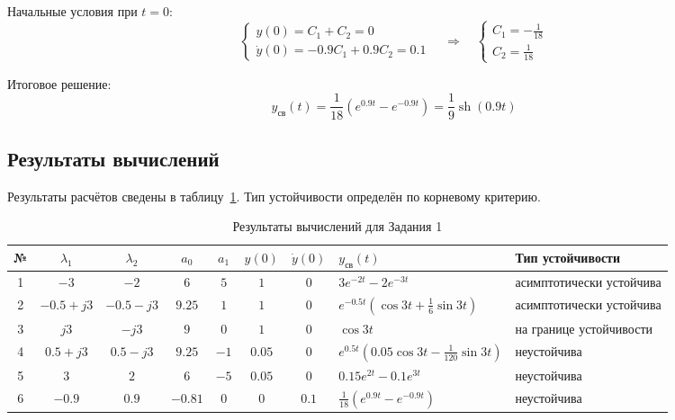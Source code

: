 \documentclass[14pt,a4paper]{extarticle}
\begin{document}
Начальные условия при $t = 0$:
\[
  \begin{cases}
    y(0) = C_1 + C_2 = 0 \\
    \dot y(0) = -0.9C_1 + 0.9C_2 = 0.1
  \end{cases}
  \quad\Rightarrow\quad
  \begin{cases}
    C_1 = -\frac{1}{18} \\
    C_2 = \frac{1}{18}
  \end{cases}
\]

Итоговое решение:
\begin{equation}
  y_{\text{св}}(t) = \frac{1}{18}\left(e^{0.9t} - e^{-0.9t}\right) = \frac{1}{9}\operatorname{sh}(0.9t)
\end{equation}



\subsection{Результаты вычислений}

Результаты расчётов сведены в таблицу~\ref{tab:task1}. Тип устойчивости определён по корневому критерию.

\begin{table}[H]
\caption{Результаты вычислений для Задания 1}\label{tab:task1}
\centering\footnotesize
\renewcommand{\arraystretch}{1.5}
\setlength{\tabcolsep}{3pt}
\begin{tabularx}{\textwidth}{|c|c|c|c|c|c|c|>{\centering\arraybackslash}X|>{\centering\arraybackslash}p{2.6cm}|}
\hline
№ & $\lambda_1$ & $\lambda_2$ & $a_0$ & $a_1$ & $y(0)$ & $\dot y(0)$ & $y_{\text{св}}(t)$ & Тип устойчивости \\ \hline
1 & $-3$ & $-2$ & $6$ & $5$ & $1$ & $0$ & $3e^{-2t}-2e^{-3t}$ & асимптотически устойчива \\ \hline
2 & $-0.5+j3$ & $-0.5-j3$ & $9.25$ & $1$ & $1$ & $0$ & $e^{-0.5t}\!\left(\cos 3t+\frac16\sin 3t\right)$ & асимптотически устойчива \\ \hline
3 & $j3$ & $-j3$ & $9$ & $0$ & $1$ & $0$ & $\cos 3t$ & на границе устойчивости \\ \hline
4 & $0.5+j3$ & $0.5-j3$ & $9.25$ & $-1$ & $0.05$ & $0$ & $e^{0.5t}\!\left(0.05\cos 3t-\frac{1}{120}\sin 3t\right)$ & неустойчива \\ \hline
5 & $3$ & $2$ & $6$ & $-5$ & $0.05$ & $0$ & $0.15e^{2t}-0.1e^{3t}$ & неустойчива \\ \hline
6 & $-0.9$ & $0.9$ & $-0.81$ & $0$ & $0$ & $0.1$ & $\frac{1}{18}\left(e^{0.9t}-e^{-0.9t}\right)$ & неустойчива \\ \hline
\end{tabularx}
\end{table}
\end{document}
